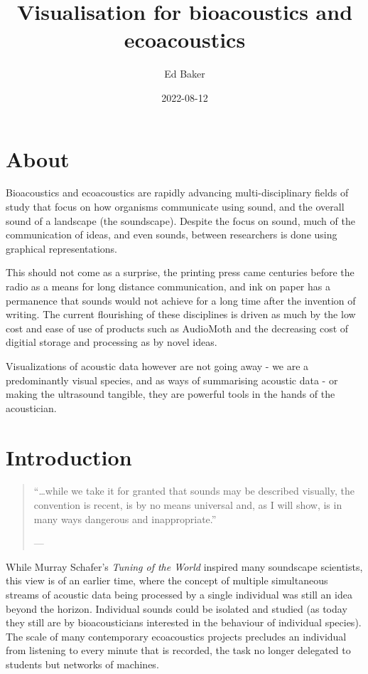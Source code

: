 \documentclass[
]{book}
\title{Visualisation for bioacoustics and ecoacoustics}
\author{Ed Baker}
\date{2022-08-12}
\begin{document}
\maketitle

{
\setcounter{tocdepth}{1}
\tableofcontents
}
\hypertarget{about}{%
\chapter*{About}\label{about}}

Bioacoustics and ecoacoustics are rapidly advancing multi-disciplinary fields of study that focus on how organisms communicate using sound, and the overall sound of a landscape (the soundscape). Despite the focus on sound, much of the communication of ideas, and even sounds, between researchers is done using graphical representations.

This should not come as a surprise, the printing press came centuries before the radio as a means for long distance communication, and ink on paper has a permanence that sounds would not achieve for a long time after the invention of writing. The current flourishing of these disciplines is driven as much by the low cost and ease of use of products such as AudioMoth and the decreasing cost of digitial storage and processing as by novel ideas.

Visualizations of acoustic data however are not going away - we are a predominantly visual species, and as ways of summarising acoustic data - or making the ultrasound tangible, they are powerful tools in the hands of the acoustician.

\hypertarget{intro}{%
\chapter{Introduction}\label{intro}}

\begin{quote}
``\ldots while we take it for granted that sounds may be described visually, the convention is recent, is by no means universal and, as I will show, is in many ways dangerous and inappropriate.''

\hfill --- \citet{schafer1977}
\end{quote}

While Murray Schafer's \emph{Tuning of the World} \citep{schafer1977} inspired many soundscape scientists, this view is of an earlier time, where the concept of multiple simultaneous streams of acoustic data being processed by a single individual was still an idea beyond the horizon. Individual sounds could be isolated and studied (as today they still are by bioacousticians interested in the behaviour of individual species). The scale of many contemporary ecoacoustics projects precludes an individual from listening to every minute that is recorded, the task no longer delegated to students but networks of machines.
\end{document}
